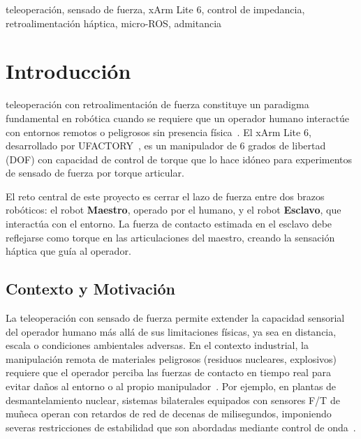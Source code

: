 \documentclass[journal,10pt,twoside]{IEEEtran}
\begin{document}
\begin{IEEEkeywords}
  teleoperación, sensado de fuerza, xArm Lite 6, control de impedancia,
  retroalimentación háptica, micro-ROS, admitancia
\end{IEEEkeywords}

\section{Introducción}

 teleoperación con retroalimentación de fuerza
constituye un paradigma fundamental en robótica cuando se requiere que
un operador humano interactúe con entornos remotos o peligrosos sin
presencia física~\cite{murray1994}. El xArm Lite 6, desarrollado por
UFACTORY~\cite{xarm_github}, es un manipulador de 6 grados de libertad
(DOF) con capacidad de control de torque que lo hace idóneo para experimentos
de sensado de fuerza por torque articular.

\begin{theorybox}[Motivación]
  El reto central de este proyecto es cerrar el lazo de fuerza entre
  dos brazos robóticos: el robot \textbf{Maestro}, operado por el humano,
  y el robot \textbf{Esclavo}, que interactúa con el entorno.
  La fuerza de contacto estimada en el esclavo debe reflejarse como
  torque en las articulaciones del maestro, creando la sensación
  háptica que guía al operador.
\end{theorybox}

\subsection{Contexto y Motivación}

La teleoperación con sensado de fuerza permite extender la capacidad
sensorial del operador humano más allá de sus limitaciones físicas, ya
sea en distancia, escala o condiciones ambientales adversas. En el
contexto industrial, la manipulación remota de materiales peligrosos
(residuos nucleares, explosivos) requiere que el operador perciba las
fuerzas de contacto en tiempo real para evitar daños al entorno o al
propio manipulador~\cite{niemeyer2008}. Por ejemplo, en plantas de
desmantelamiento nuclear, sistemas bilaterales equipados con sensores
F/T de muñeca operan con retardos de red de decenas de milisegundos,
imponiendo severas restricciones de estabilidad que son abordadas
mediante control de onda~\cite{niemeyer2008}.
\end{document}
